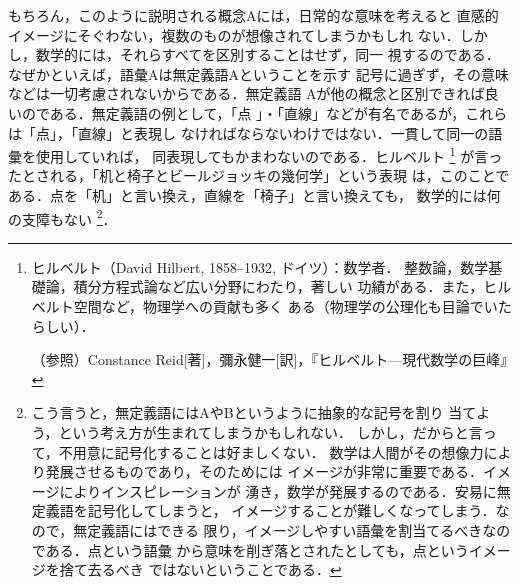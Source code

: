                 もちろん，このように説明される概念Aには，日常的な意味を考えると
                直感的イメージにそぐわない，複数のものが想像されてしまうかもしれ
                ない．しかし，数学的には，それらすべてを区別することはせず，同一
                視するのである．なぜかといえば，語彙Aは無定義語Aということを示す
                記号に過ぎず，その意味などは一切考慮されないからである．無定義語
                Aが他の概念と区別できれば良いのである．無定義語の例として，「点
                」・「直線」などが有名であるが，これらは「点」，「直線」と表現し
                なければならないわけではない．一貫して同一の語彙を使用していれば，
                同表現してもかまわないのである．ヒルベルト
                    \footnote{
                        ヒルベルト（David Hilbert, 1858--1932, ドイツ）：数学者．
                        整数論，数学基礎論，積分方程式論など広い分野にわたり，著しい
                        功績がある．また，ヒルベルト空間など，物理学への貢献も多く
                        ある（物理学の公理化も目論でいたらしい）．

                        （参照）Constance Reid[著]，彌永健一[訳]，『ヒルベルト---現代数学の巨峰』
                    }
                が言ったとされる，「机と椅子とビールジョッキの幾何学」という表現
                は，このことである．点を「机」と言い換え，直線を「椅子」と言い換えても，
                数学的には何の支障もない
                    \footnote{
                        こう言うと，無定義語にはAやBというように抽象的な記号を割り
                        当てよう，という考え方が生まれてしまうかもしれない．
                        しかし，だからと言って，不用意に記号化することは好ましくない．
                        数学は人間がその想像力により発展させるものであり，そのためには
                        イメージが非常に重要である．イメージによりインスピレーションが
                        湧き，数学が発展するのである．安易に無定義語を記号化してしまうと，
                        イメージすることが難しくなってしまう．なので，無定義語にはできる
                        限り，イメージしやすい語彙を割当てるべきなのである．点という語彙
                        から意味を削ぎ落とされたとしても，点というイメージを捨て去るべき
                        ではないということである．
                    }．

